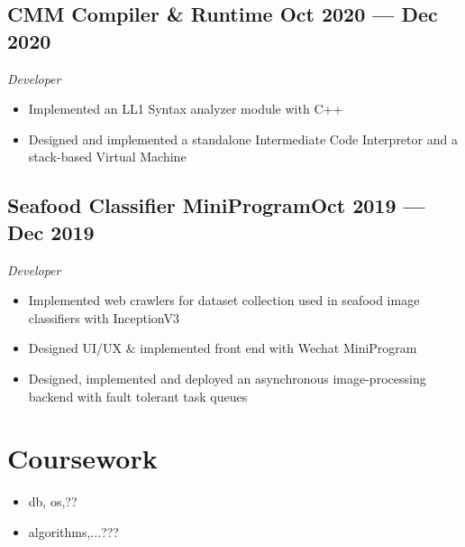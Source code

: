 \documentclass[a4,12pt]{article}
\newcommand{\subtext}[1]{
#1\par\vspace{-0.3cm}}
\newenvironment{zitemize}{
\begin{itemize}\itemsep0pt \parskip0pt \parsep1pt}
{\end{itemize}\vspace{-0.5cm}}
\begin{document}
\subsection*{CMM Compiler \& Runtime \hfill \textbf{Oct 2020 --- Dec 2020}}
\subtext{\textit{Developer}}
\begin{zitemize}
    \item Implemented an LL1 Syntax analyzer module with C++
    \item Designed and implemented a standalone Intermediate Code Interpretor and a stack-based Virtual Machine
\end{zitemize}

\subsection*{Seafood Classifier MiniProgram\hfill \textbf{Oct 2019 --- Dec 2019}}
\subtext{\textit{Developer}}
\begin{zitemize}
    \item Implemented web crawlers for dataset collection used in seafood image classifiers with InceptionV3
    \item Designed UI/UX \& implemented front end with Wechat MiniProgram
    \item Designed, implemented and deployed an asynchronous image-processing backend with fault tolerant task queues
\end{zitemize}



\section{\textbf{Coursework}}
\begin{zitemize}
    \item db, os,??
    \item algorithms,...???
\end{zitemize}







\end{document}
